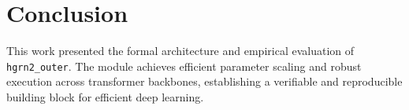\section{Conclusion}
This work presented the formal architecture and empirical evaluation of \texttt{hgrn2_outer}. The module achieves efficient parameter scaling and robust execution across transformer backbones, establishing a verifiable and reproducible building block for efficient deep learning.
